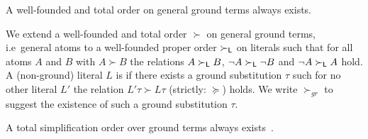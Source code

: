 \begin{lemma}A well-founded and total order on general ground terms always exists.\end{lemma}

	\begin{definition}\label{def:orders-on-literals}
		We extend a well-founded and total order \( \succ \) on general ground terms,
		i.e~general atoms to a well-founded proper order \( \succ_{\mathsf{L}} \)
		on literals such that for all atoms \( A \) and \( B \) with \( A\succ B \)
		the relations \( A\succ_{\mathsf{L}} B \),
		\( \lnot A\succ_{\mathsf{L}}\lnot B \) and
		\( \lnot A\succ_{\mathsf{L}} A \) hold.
		A (non-ground) literal \( L \) is  if there exists a ground substitution \( \tau \)
		such for no other literal \( L' \) the relation \( L'\tau\succ L\tau \) (strictly: \( \succcurlyeq \)) holds.
		We write \( \succ_{gr} \) to suggest the existence of such a ground substitution \( \tau \).
	\end{definition}
%

%
\begin{lemma}
    A total simplification order
    over ground terms always exists~\cite{NR2001}.
\end{lemma}

